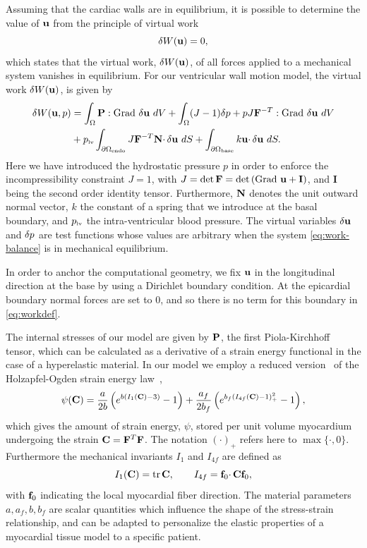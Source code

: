 Assuming that the cardiac walls are in equilibrium,
it is possible to determine the value of $\mathbf{u}$ from the principle of
virtual work
\begin{equation}
  \label{eq:work-balance}
  \delta W(\mathbf{u}) = 0,
\end{equation}
which states that the virtual work, $\delta W(\mathbf{u})$, of all forces
applied to a mechanical system vanishes in equilibrium. For our ventricular wall motion
model, the virtual work $\delta W(\mathbf{u})$, is given by
\begin{equation}
\begin{aligned}
\label{eq:workdef}
 \delta W(\uvec, p) &= \int_{\Omega} \FPK : \Grad \ \du \ dV 
		  + \int_{\Omega} (J - 1) \dpre + p J \F^{-T} : \Grad \ \du \ dV  \\
		 &+ \plv \int_{\lvendo} J \F^{-T} \Nvec \cdotp \du \ dS 
		  +  \int_{\lvbase}  k \uvec \cdotp \du \ dS.
 \end{aligned}
\end{equation}
Here we have introduced the hydrostatic pressure $p$ in order to enforce the 
incompressibility constraint $J =1$, with $J = \det \mathbf{F} = \det  \left(\mathrm{Grad} \ \mathbf{u} + \mathbf{I}\right)$, 
and $\mathbf{I}$ being the second order identity tensor. 
Furthermore, $\mathbf{N}$ denotes the unit outward normal vector, $k$ 
the constant of a spring that we introduce at the basal boundary, and $p_{\textnormal{\tiny{lv}}}$ the intra-ventricular 
blood pressure. The virtual variables $\delta {\bf u}$ and $\delta {p}$ are test functions whose values
are arbitrary when the system \eqref{eq:work-balance} is in mechanical
equilibrium.

In order to anchor the computational geometry, we fix $\mathbf{u}$ in the longitudinal direction 
at the base by using a Dirichlet boundary condition. At the epicardial boundary normal
forces are set to 0, and so there is no term for this boundary in
\eqref{eq:workdef}.

The internal stresses of our model are given by $\mathbf{P}$, the first Piola-Kirchhoff tensor,
which can be calculated as a derivative of a strain energy functional
in the case of a hyperelastic material.
In our model we employ a reduced version~\cite{Krishnamurthy2013, gjerald2015patient,
  asner2015estimation, hadjicharalambous2015analysis} of the
Holzapfel-Ogden strain energy law~\cite{Holzapfel2009}, 
\begin{equation}
\label{eq:hoa}
 \psi(\mathbf{C}) = \frac{a}{2 b} \left( e^{ b (I_1(\mathbf{C})
 - 3)}  -1 \right)
 + \frac{a_f}{2b_f} \left( e^{ b_f (I_{4f}(\mathbf{C})
 - 1)_+^2} -1 \right),
\end{equation}
which gives the amount of strain energy, $\psi$, stored per unit
volume myocardium undergoing the strain $\mathbf{C} = \mathbf{F}^{T} \mathbf{F}$.
The notation
$(\cdotp)_{+}$ refers here to $\max\{\cdotp, 0\}$.  Furthermore
the mechanical invariants $I_1$ and $I_{4f}$ are defined as
\begin{equation}
I_1(\mathbf{C}) = \mathrm{tr} \hspace{0.05cm} \mathbf{C},  \quad \quad I_{4f} = \mathbf{f}_0 \cdotp \mathbf{C} \mathbf{f}_0,
\end{equation}
with $\mathbf{f}_0$ indicating the local myocardial fiber direction. The
material parameters $a, a_f, b, b_f$ are scalar quantities which influence the shape of
the stress-strain relationship, and can be adapted to personalize the
elastic properties of a myocardial tissue model to a specific patient.


